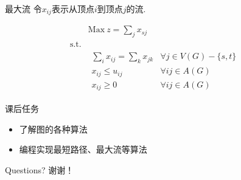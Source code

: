 \documentclass[UTF8]{ctexbeamer}
\begin{document}
\begin{frame}{最大流}
  令$x_{ij}$表示从顶点$i$到顶点$j$的流.

  \[ 
  \begin{array}{lcl}
    & \mbox{Max}\ z = \sum_{j} x_{sj} & \\
    \mbox{s.t.} & &  \\
    &
    \begin{array}{cc}
      \sum_i x_{ij} = \sum_k x_{jk} & \forall j \in V(G)-\{s, t\}\\
      x_{ij} \le u_{ij} & \forall ij \in A(G)\\
      x_{ij} \ge 0 & \forall ij \in A(G)
    \end{array}
    &
  \end{array}
  \]
  
\end{frame}

\begin{frame}{课后任务}
  \begin{itemize}
  \item 了解图的各种算法
  \item 编程实现最短路径、最大流等算法
  \end{itemize}
\end{frame}

\begin{frame}
  Questions?
  谢谢！
\end{frame}
\end{document}
